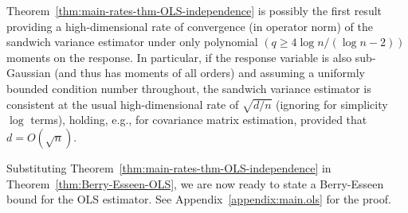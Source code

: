 \documentclass[11pt]{article}
\begin{document}
Theorem~\ref{thm:main-rates-thm-OLS-independence} is possibly the first result providing a high-dimensional rate of convergence (in operator norm)  of the sandwich variance estimator under only polynomial $(q\ge4\log n/(\log n - 2))$ moments on the response. 
In particular, if the response variable is also sub-Gaussian (and thus has moments of all orders) and assuming a uniformly bounded condition number throughout,  the sandwich variance estimator is consistent at the usual high-dimensional rate of $\sqrt{d/n}$ (ignoring for simplicity $\log$ terms), holding, e.g., for covariance matrix estimation, provided that $d = O(\sqrt{n})$. 



Substituting Theorem~\ref{thm:main-rates-thm-OLS-independence} in Theorem~\ref{thm:Berry-Esseen-OLS}, we are now ready to state a Berry-Esseen bound for the OLS estimator. See Appendix~\ref{appendix:main.ols} for the proof. 
\end{document}
